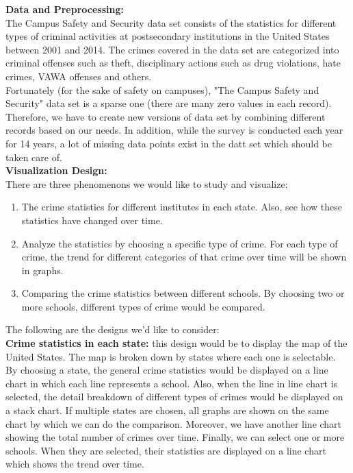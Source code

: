 \noindent
\textbf{Data and Preprocessing:}\\
The Campus Safety and Security data set consists of the statistics for different types of criminal activities at postsecondary institutions in the United States between 2001 and 2014. The crimes covered in the data set are categorized into criminal offenses such as theft, disciplinary actions such as drug violations, hate crimes, VAWA offenses and others.\\
Fortunately (for the sake of safety on campuses), "The Campus Safety and Security" data set is a sparse one (there are many zero values in each record). Therefore, we have to create new versions of data set by combining different records based on our needs. In addition, while the survey is conducted each year for 14 years, a lot of missing data points exist in the datt set which should be taken care of.\\


\noindent
\textbf{Visualization Design:}\\
There are three phenomenons we would like to study and visualize:
\begin{enumerate}
\item The crime statistics for different institutes in each state. Also, see how these statistics have changed over time.
\item Analyze the statistics by choosing a specific type of crime. For each type of crime, the trend for different categories of that crime over time will be shown in graphs.
\item Comparing the crime statistics between different schools. By choosing two or more schools, different types of crime would be compared.
\end{enumerate}
The following are the designs we'd like to consider:\\
\noindent	
\textbf{Crime statistics in each state:} this design would be to display the map of the United States. The map is broken down by states where each one is selectable. By choosing a state, the general crime statistics would be displayed on a line chart in which each line represents a school. Also, when the line in line chart is selected, the detail breakdown of different types of crimes would be displayed on a stack chart. If multiple states are chosen, all graphs are shown on the same chart by which we can do the comparison. Moreover, we have another line chart showing the total number of crimes over time. Finally, we can select one or more schools. When they are selected, their statistics are displayed on a line chart which shows the trend over time.
	
